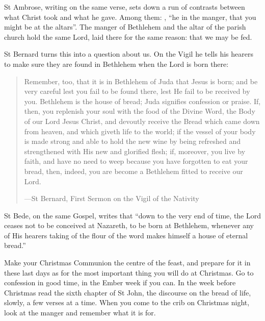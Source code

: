 St Ambrose, writing on the same verse, sets down a run of contrasts between
what Christ took and what he gave. Among them:
, ``he in the manger, that you
might be at the altars''. The manger of Bethlehem and the altar of the parish
church hold the same Lord, laid there for the same reason: that we may be
fed.

St Bernard turns this into a question about us. On the Vigil he tells his hearers
to make sure they are found in Bethlehem when the Lord is born there:

\begin{quote}
Remember, too, that it is in Bethlehem of Juda that Jesus is born; and be very
careful lest you fail to be found there, lest He fail to be received by you.
Bethlehem is the house of bread; Juda signifies confession or praise. If, then,
you replenish your soul with the food of the Divine Word, the Body of our Lord
Jesus Christ, and devoutly receive the Bread which came down from heaven, and
which giveth life to the world; if the vessel of your body is made strong and
able to hold the new wine by being refreshed and strengthened with His new and
glorified flesh; if, moreover, you live by faith, and have no need to weep
because you have forgotten to eat your bread, then, indeed, you are become a
Bethlehem fitted to receive our Lord.\par
{\smallskip\noindent\small ---St Bernard, First Sermon on the Vigil of the Nativity\par}
\end{quote}

St Bede, on the same Gospel, writes that ``down to the very end of time, the
Lord ceases not to be conceived at Nazareth, to be born at Bethlehem, whenever
any of His hearers taking of the flour of the word makes himself a house of
eternal bread.''

Make your Christmas Communion the centre of the feast, and prepare for it in
these last days as for the most important thing you will do at Christmas. Go to
confession in good time, in the Ember week if you can. In the
week before Christmas read the sixth chapter of St John, the discourse on the
bread of life, slowly, a few verses at a time. When you come to the crib on
Christmas night, look at the manger and remember what it is for.
